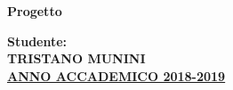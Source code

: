 \documentclass{article}
\begin{document}
\begin{titlepage}
 	\centering
  \Huge{\textbf{Progetto}}\\
 	[30mm]
  \raggedright
  \Large{\textbf{Studente:}}\\
  \Large{\textbf{TRISTANO MUNINI}}\\
 	[90mm]
 	\centering
  \LARGE{\underline{\textbf{ANNO ACCADEMICO 2018-2019}}}\\
\end{titlepage}



\tableofcontents
\thispagestyle{empty}
\cleardoublepage
\setcounter{page}{1}






\cleardoublepage


\end{document}

